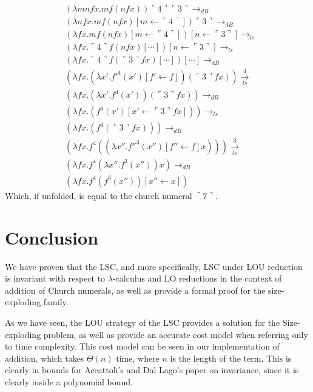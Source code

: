 \documentclass[11pt]{article}
\begin{document}
\begin{equation}
  \begin{split}
    & (\lambda mnfx.m f (n f x)) \ulcorner 4 \urcorner \ulcorner 3 \urcorner \rightarrow_{dB} \\
    & (\lambda nfx. m f (n f x )[m \leftarrow \ulcorner 4 \urcorner ]) \ulcorner 3 \urcorner \rightarrow_{dB} \\
    & (\lambda fx. mf (n f x)[m \leftarrow \ulcorner 4 \urcorner])[n \leftarrow \ulcorner 3 \urcorner] \rightarrow_{ls} \\
    & (\lambda fx. \ulcorner 4 \urcorner f (n f x)[\cdots])[n \leftarrow \ulcorner 3 \urcorner] \rightarrow_{ls} \\
    & (\lambda fx. \ulcorner 4 \urcorner f (\ulcorner 3 \urcorner f x)[\cdots])[\cdots] \rightarrow_{dB} \\
    & (\lambda fx.(\lambda x' .f'^4(x')[f'\leftarrow f])(\ulcorner 3 \urcorner f x)) \xrightarrow[ls]{4} \\
    & (\lambda fx. (\lambda x' .f^4(x')) (\ulcorner 3 \urcorner f x)) \rightarrow_{dB} \\
    & (\lambda fx. (f^4(x')[x' \leftarrow \ulcorner 3 \urcorner f x])) \rightarrow_{ls} \\
    & (\lambda fx. (f^4(\ulcorner 3 \urcorner f x))) \rightarrow_{dB} \\
    & (\lambda fx. f^4((\lambda x''.f''^3(x'')[f'' \leftarrow f]x))) \xrightarrow[ls]{3}\\
    & (\lambda fx. f^4(\lambda x''.f^3(x''))x) \rightarrow_{dB} \\
    & (\lambda fx. f^4(f^3(x''))[x'' \leftarrow x])
  \end{split}
\end{equation}
Which, if unfolded, is equal to the church numeral $\ulcorner 7 \urcorner$.
\section{Conclusion}
We have proven that the LSC, and more specifically, LSC under LOU reduction is invariant with respect to $\lambda$-calculus and LO reductions in the context of addition of Church numerals, as well as provide a formal proof for the size-exploding family.

As we have seen, the LOU strategy of the LSC provides a solution for the Size-exploding problem, as well as provide an accurate cost model when referring only to time complexity. This cost model can be seen in our implementation of addition, which takes $\Theta(n)$ time, where $n$ is the length of the term. This is clearly in bounds for Accattoli's and Dal Lago's paper on invariance, since it is clearly inside a polynomial bound.
\end{document}
